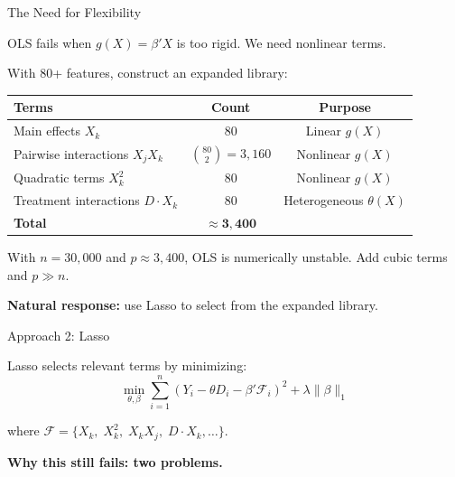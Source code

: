 \documentclass[aspectratio=169, 11pt]{beamer}
\begin{document}
\begin{frame}{The Need for Flexibility}

OLS fails when $g(X) = \beta'X$ is too rigid. We need nonlinear terms.

\bigskip

With 80+ features, construct an expanded library:

\medskip

\begin{center}
\small
\begin{tabular}{lcc}
\toprule
\textbf{Terms} & \textbf{Count} & \textbf{Purpose} \\
\midrule
Main effects $X_k$           & 80   & Linear $g(X)$ \\
Pairwise interactions $X_jX_k$ & $\binom{80}{2} = 3{,}160$ & Nonlinear $g(X)$ \\
Quadratic terms $X_k^2$      & 80   & Nonlinear $g(X)$ \\
Treatment interactions $D\cdot X_k$ & 80 & Heterogeneous $\theta(X)$ \\
\midrule
\textbf{Total} & $\mathbf{\approx 3{,}400}$ & \\
\bottomrule
\end{tabular}
\end{center}

\bigskip
\pause

With $n = 30{,}000$ and $p \approx 3{,}400$, OLS is numerically unstable. Add cubic terms and $p \gg n$.

\bigskip

\textbf{Natural response:} use Lasso to select from the expanded library.

\end{frame}

\begin{frame}{Approach 2: Lasso}

Lasso selects relevant terms by minimizing:
\[
\min_{\theta, \beta} \sum_{i=1}^n (Y_i - \theta D_i - \beta'\mathcal{F}_i)^2 + \lambda \|\beta\|_1
\]

where $\mathcal{F} = \{X_k,\; X_k^2,\; X_k X_j,\; D \cdot X_k, \ldots\}$.

\bigskip
\pause

\textbf{Why this still fails: two problems.}

\end{frame}
\end{document}
